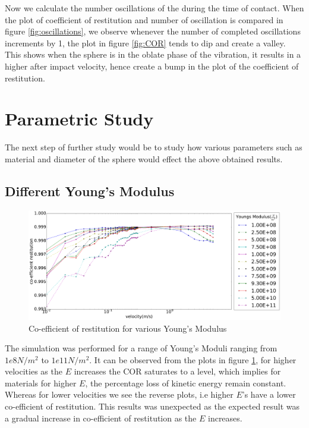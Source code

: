 Now we calculate the number oscillations of the during the time of contact. When the plot of coefficient of restitution and number of oscillation is compared in figure \ref{fig:oscillations}, we observe whenever the number of completed oscillations increments by 1, the plot in figure \ref{fig:COR} tends to dip and create a valley. This shows when the sphere is in the oblate phase of the vibration, it results in a higher after impact velocity, hence create a bump in the plot of the coefficient of restitution.




\section{Parametric Study}

The next step of further study would be to study how various parameters such as material and diameter of the sphere would effect the above obtained results.


\subsection{Different Young's Modulus}

\begin{figure}[H]
\includegraphics[width=1.0\textwidth]{../images/parametricStudy/CORdiffE_pdf.pdf}
\caption{Co-efficient of restitution for various Young's Modulus}
\label{fig:CORdiffEcomplete}
\end{figure}

The simulation was performed for a range of Young's Moduli ranging from $1e8N/m^{2}$ to $1e11N/m^{2}$. It can be observed from the plots in figure \ref{fig:CORdiffEcomplete}, for higher velocities as the $E$ increases the COR saturates to a level, which implies for materials for higher $E$, the percentage loss of kinetic energy remain constant. Whereas for lower velocities we see the reverse plots, i.e higher $E$'s have a lower co-efficient of restitution. This results was unexpected as the expected result was a gradual increase in co-efficient of restitution as the $E$ increases. 

